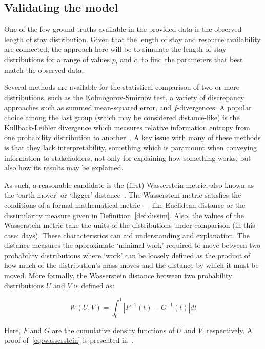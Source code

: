 \subsection{Validating the model}\label{subsec:validate}

One of the few ground truths available in the provided data is the observed
length of stay distribution. Given that the length of stay and resource
availability are connected, the approach here will be to simulate the length of
stay distributions for a range of values \(p_l\) and \(c\), to find the
parameters that best match the observed data.

Several methods are available for the statistical comparison of two or more
distributions, such as the Kolmogorov-Smirnov test, a variety of discrepancy
approaches such as summed mean-squared error, and \(f\)-divergences. A popular
choice among the last group (which may be considered distance-like) is the
Kullback-Leibler divergence which measures relative information entropy from one
probability distribution to another~\cite{Kullback1951}. A key issue with many
of these methods is that they lack interpretability, something which is
paramount when conveying information to stakeholders, not only for explaining
how something works, but also how its results may be explained.

As such, a reasonable candidate is the (first) Wasserstein metric, also known as
the `earth mover' or `digger' distance~\cite{Vaserstein1969}. The Wasserstein
metric satisfies the conditions of a formal mathematical metric --- like
Euclidean distance or the dissimilarity measure given in
Definition~\ref{def:dissim}. Also, the values of the Wasserstein metric take the
units of the distributions under comparison (in this case: days). These
characteristics can aid understanding and explanation. The distance measures the
approximate `minimal work' required to move between two probability
distributions where `work' can be loosely defined as the product of how much of
the distribution's mass moves and the distance by which it must be moved. More
formally, the Wasserstein distance between two probability distributions \(U\)
and \(V\) is defined as:

\begin{equation}\label{eq:wasserstein}
    W(U, V) = \int_{0}^{1} \left\vert F^{-1}(t) - G^{-1}(t) \right\vert dt
\end{equation}

Here, \(F\) and \(G\) are the cumulative density functions of \(U\) and \(V\),
respectively. A proof of~\eqref{eq:wasserstein} is presented
in~\cite{Ramdas2017}.

